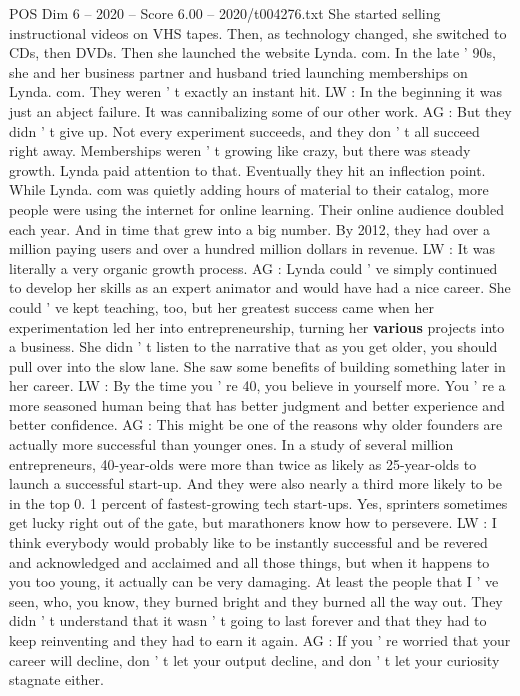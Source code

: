 \begin{textsample}{POS Dim 6 – 2020 – Score 6.00 – 2020/t004276.txt}
She started selling instructional videos on VHS tapes.
Then, as technology changed, she switched to CDs, then DVDs.
Then she launched the website Lynda. com.
In the late ' 90s, she and her business partner and husband tried launching memberships on Lynda. com.
They weren ' t exactly an instant hit.
LW : In the beginning it was just an abject failure.
It was cannibalizing some of our other work.
AG : But they didn ' t give up.
Not every experiment succeeds, and they don ' t all succeed right away.
Memberships weren ' t growing like crazy, but there was steady growth.
Lynda paid attention to that.
Eventually they hit an inflection point.
While Lynda. com was quietly adding hours of material to their catalog, more people were using the internet for online learning.
Their online audience doubled each year.
And in time that grew into a big number.
By 2012, they had over a million paying users and over a hundred million dollars in revenue.
LW : It was literally a very organic growth process.
AG : Lynda could ' ve simply continued to develop her skills as an expert animator and would have had a nice career.
She could ' ve kept teaching, too, but her greatest success came when her experimentation led her into entrepreneurship, turning her \textbf{various} projects into a business.
She didn ' t listen to the narrative that as you get older, you should pull over into the slow lane.
She saw some benefits of building something later in her career.
LW : By the time you ' re 40, you believe in yourself more.
You ' re a more seasoned human being that has better judgment and better experience and better confidence.
AG : This might be one of the reasons why older founders are actually more successful than younger ones.
In a study of several million entrepreneurs, 40-year-olds were more than twice as likely as 25-year-olds to launch a successful start-up.
And they were also nearly a third more likely to be in the top 0. 1 percent of fastest-growing tech start-ups.
Yes, sprinters sometimes get lucky right out of the gate, but marathoners know how to persevere.
LW : I think everybody would probably like to be instantly successful and be revered and acknowledged and acclaimed and all those things, but when it happens to you too young, it actually can be very damaging.
At least the people that I ' ve seen, who, you know, they burned bright and they burned all the way out.
They didn ' t understand that it wasn ' t going to last forever and that they had to keep reinventing and they had to earn it again.
AG : If you ' re worried that your career will decline, don ' t let your output decline, and don ' t let your curiosity stagnate either.

\end{textsample}
